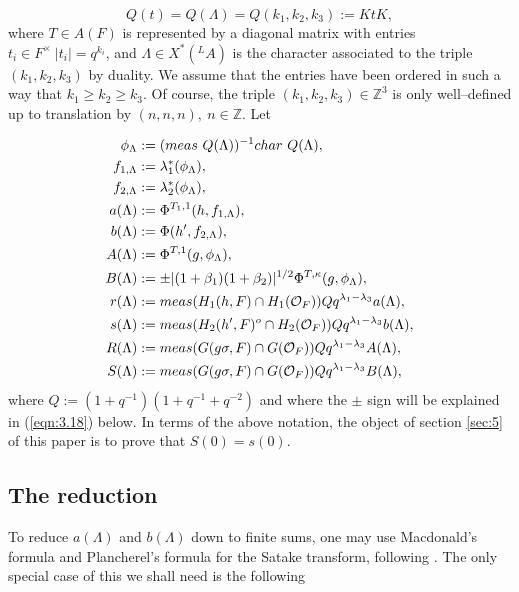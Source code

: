\documentclass[12pt,letterpaper]{article}
\def\zzz{\mathbb{Z}}
\def\off{{\cal O}_F}
\begin{document}
\[
Q(t) = Q(\Lambda )=Q(k_1,k_2,k_3) := KtK,
\]
where $T\in A(F)$ is represented by a diagonal matrix with entries
$t_i \in F^{\times}\ |t_i|=q^{k_i}$, and $\Lambda\in X^*({^{L}}A)$
is the character associated to the triple $(k_1,k_2,k_3)$ by duality. 
We assume that the entries have been
ordered in such a way that $k_1\geq k_2\geq k_3$. Of course, the triple
$(k_1,k_2,k_3)\in \zzz^3$ is only well--defined up to translation by
$(n,n,n), \ n\in \zzz$. Let

\[
\begin{split}
\phi_{\Lambda} 
&:= (meas\ Q(\Lambda ))^{-1}char\ Q(\Lambda ),\\
f_{1,\Lambda} 
&:= \lambda_1^*(\phi_{\Lambda}),\\
f_{2,\Lambda} 
&:= \lambda_2^*(\phi_{\Lambda}),\\
a(\Lambda ) 
&:=\Phi^{T_1,1}(h,f_{1,\Lambda}),\\
b(\Lambda ) 
&:=\Phi(h',f_{2,\Lambda}),\\
A(\Lambda ) 
&:=\Phi^{T,1}(g,\phi_{\Lambda}),\\
B(\Lambda ) 
&:=\pm
|(1+\beta_1)(1+\beta_2)|^{1/2}\Phi^{T,\kappa}(g,\phi_{\Lambda}),\\
r(\Lambda )
&:= meas(H_{1}(h,F)\cap H_1(\off ))Qq^{\lambda_1-\lambda_3}a(\Lambda ),\\
s(\Lambda )
&:= meas(H_{2}(h',F)^o\cap H_2(\off ))Qq^{\lambda_1-\lambda_3}b(\Lambda ),\\
R(\Lambda )
&:= meas(G(g\sigma,F)\cap G(\off ))Qq^{\lambda_1-\lambda_3}A(\Lambda ),\\
S(\Lambda )
&:= meas(G(g\sigma,F)\cap G(\off ))Qq^{\lambda_1-\lambda_3}B(\Lambda ),
\end{split}
\]
where
$Q:=(1+q^{-1})(1+q^{-1}+q^{-2})$ and where the $\pm$ sign will be
explained in (\ref{eqn:3.18}) below.
In terms of the above notation, the object of section \ref{sec:5} 
of this paper is to prove that $S(0) = s(0)$.

\subsection{The reduction}
\label{sec:3.2}

To reduce $a(\Lambda )$ and $b(\Lambda )$ down to finite sums, one may
use Macdonald's formula \cite{M} and Plancherel's formula for the Satake
transform, following \cite{La1}. The only special case of this we shall
need is the following
\end{document}
